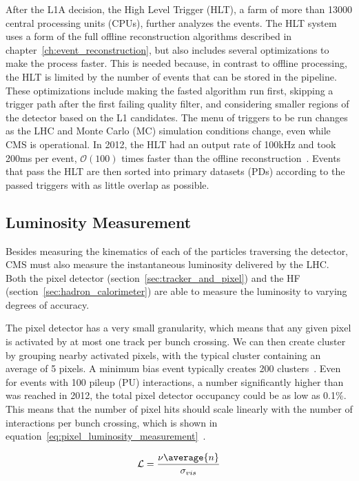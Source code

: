 After the L1A decision, the High Level Trigger (HLT), a farm of more than 13000 central processing units (CPUs), further analyzes the events. The HLT 
system uses a form of the full offline reconstruction algorithms described in chapter~\ref{ch:event_reconstruction}, but also includes several optimizations to make the process faster. This is needed because, in contrast to offline processing, the HLT is limited by the number of events that can be stored in the pipeline. These optimizations include making the fasted algorithm run first, skipping a trigger path after the first failing quality filter, and considering smaller regions of the detector based on the L1 candidates. The menu of triggers to be run changes as the LHC and Monte Carlo (MC) simulation conditions change, even while CMS is operational. In 2012, the HLT had an output rate of 100\unit{kHz} and took 200\unit{ms} per event, $\mathcal{O}(100)$ times faster than the offline reconstruction~\cite{Trocino:2014jya}. Events that pass the HLT are then sorted into primary datasets (PDs) according to the passed triggers with as little overlap as possible.

\subsection{Luminosity Measurement}

Besides measuring the kinematics of each of the particles traversing the detector, CMS must also measure the instantaneous luminosity delivered by the LHC.
Both the pixel detector (section~\ref{sec:tracker_and_pixel}) and the HF (section~\ref{sec:hadron_calorimeter}) are able to measure the luminosity to varying degrees of accuracy.

The pixel detector has a very small granularity, which means that any given pixel is activated by at most one track per bunch crossing.
We can then create cluster by grouping nearby activated pixels, with the typical cluster containing an average of 5 pixels.
A minimum bias event typically creates 200 clusters~\cite{CMS-PAS-LUM-12-001}.
Even for events with 100 pileup (PU) interactions, a number significantly higher than was reached in 2012, the total pixel detector occupancy could be as low as 0.1\%.
This means that the number of pixel hits should scale linearly with the number of interactions per bunch crossing, which is shown in equation~\ref{eq:pixel_luminosity_measurement}~\cite{CMS-PAS-LUM-13-001}.

\begin{equation}
\mathcal{L}=\frac{\nu\average{n}}{\sigma_{vis}}
\label{eq:pixel_luminosity_measurement}
\end{equation}

